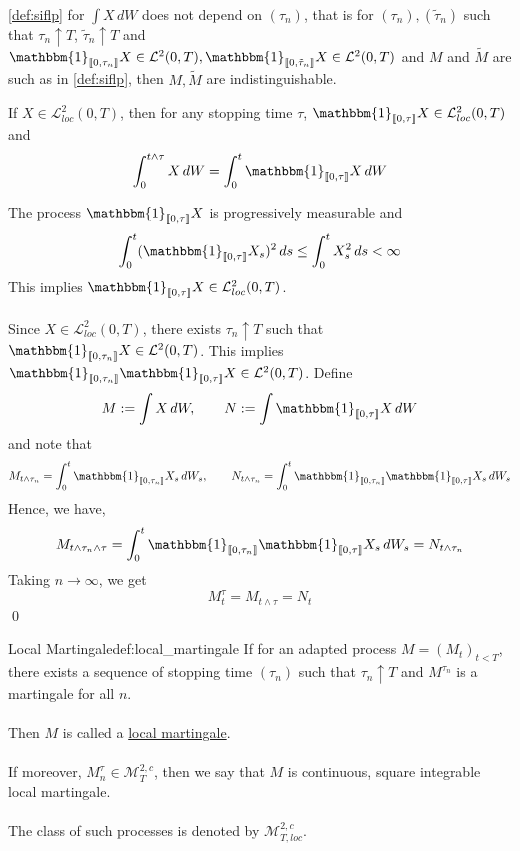 \documentclass[12pt,a4paper]{article}
\renewenvironment{proof}
    {\begin{trivlist}\item[\hskip\labelsep\color{blue}\bfseries Proof:]}
    {\qed\end{trivlist}}
\begin{document}
\begin{proposition}{}{}
    \autoref{def:siflp} for $\int X\,dW$ does not depend on $(\tau_n)$, that is for $(\tau_n), (\tilde \tau_n)$ such that $\tau_n\uparrow T$, $\tilde\tau_n\uparrow T$ and $\mathbbm{1}_{\llbracket 0,\tau_n\rrbracket}X\in\mathcal{L}^2(0,T), \mathbbm{1}_{\llbracket 0, \tilde\tau_n\rrbracket} X\in\mathcal{L}^2(0,T)$ and $M$ and $\tilde M$ are such as in \autoref{def:siflp}, then $M,\tilde M$ are indistinguishable.
\end{proposition}
\pagebreak
\begin{theorem}{}{}
    If $X\in\mathcal{L}^2_{loc}(0,T)$, then for any stopping time $\tau$, $\mathbbm{1}_{\llbracket 0,\tau\rrbracket} X\in\mathcal{L}^2_{loc}(0,T)$ and
    $$
    \int_0^{t\wedge \tau} X\, dW = \int_0^t \mathbbm{1}_{\llbracket 0,\tau \rrbracket} X\, dW
    $$
\end{theorem}
\begin{proof}
The process $\mathbbm{1}_{\llbracket 0,\tau \rrbracket} X$ is progressively measurable and 
$$
\int_0^t (\mathbbm{1}_{\llbracket 0,\tau\rrbracket}X_s)^2\,ds \le \int_0^t X_s^2\, ds<\infty
$$
This implies $\mathbbm{1}_{\llbracket 0,\tau\rrbracket}X \in\mathcal{L}^2_{loc}(0,T)$.\\
\\
Since $X\in \mathcal{L}^2_{loc}(0,T)$, there exists $\tau_n\uparrow T$ such that $\mathbbm{1}_{\llbracket 0,\tau_n\rrbracket}X\in\mathcal{L}^2(0,T)$. This implies $\mathbbm{1}_{\llbracket 0,\tau_n\rrbracket}\mathbbm{1}_{\llbracket 0,\tau \rrbracket}X\in\mathcal{L}^2(0,T)$. Define
$$
M:= \int X\, dW,\qquad N:= \int \mathbbm{1}_{\llbracket 0,\tau\rrbracket} X\, dW
$$
and note that
$$
M_{t\wedge \tau_n} = \int_0^t \mathbbm{1}_{\llbracket 0,\tau_n\rrbracket}X_s\, dW_s,\qquad N_{t\wedge \tau_n}=\int_0^t \mathbbm{1}_{\llbracket 0,\tau_n\rrbracket}\mathbbm{1}_{\llbracket 0,\tau\rrbracket}X_s\,dW_s
$$
Hence, we have,
$$
M_{t\wedge \tau_n\wedge \tau} = \int_0^t \mathbbm{1}_{\llbracket 0,\tau_n\rrbracket}\mathbbm{1}_{\llbracket 0,\tau \rrbracket}X_s\, dW_s = N_{t\wedge\tau_n}
$$
Taking $n\to\infty$, we get
$$
M_t^\tau = M_{t\wedge \tau}  =N_t
$$
\end{proof}
\pagebreak
\begin{definition}{Local Martingale}{def:local_martingale}
If for an adapted process $M=(M_t)_{t<T}$, there exists a sequence of stopping time $(\tau_n)$ such that $\tau_n\uparrow T$ and $M^{\tau_n}$ is a martingale for all $n$.\\
\\
Then $M$ is called a \underline{local martingale}.\\
\\
If moreover, $M^\tau_n \in \mathcal{M}^{2,c}_T$, then we say that $M$ is continuous, square integrable local martingale.\\
\\
The class of such processes is denoted by $\mathcal{M}^{2,c}_{T,loc}$.
\end{definition}
\end{document}
